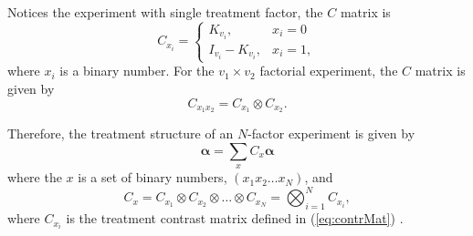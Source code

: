 \documentclass[article]{jss}
\begin{document}
Notices the experiment with single treatment factor, the $C$ matrix is  
\begin{equation}
\label{eq:contrMat}
C_{x_i} =
   \begin{cases}
       K_{v_i}, & x_i = 0 \\
       I_{v_i} - K_{v_i}, & x_i = 1,
    \end{cases}
\end{equation}
where $x_i$ is a binary number. For the $v_1 \times v_2$ factorial experiment, the $C$ matrix is given by 
\[
C_{x_1 x_2} = C_{x_1} \otimes  C_{x_2}. 
\]

Therefore, the treatment structure of an $N$-factor experiment is given by 
\begin{equation}
\bm{\alpha} = \sum_x{C_x\bm{\alpha}}
\end{equation}
where the $x$ is a set of binary numbers, $(x_1 x_2 \dots x_{N})$, and 
\[
C_x =  C_{x_1} \otimes  C_{x_2} \otimes \dots \otimes  C_{x_{N}} = \bigotimes^{N} _{i = 1} C_{x_i},
\]
where $ C_{x_i}$ is the treatment contrast matrix defined in (\ref{eq:contrMat}) \citep{John1987}.
\end{document}
